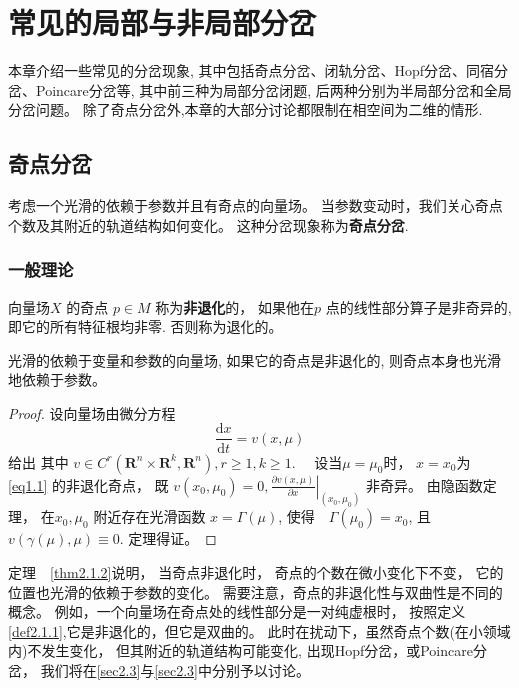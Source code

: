 \chapter{常见的局部与非局部分岔}
本章介绍一些常见的分岔现象,
其中包括奇点分岔、闭轨分岔、Hopf分岔、同宿分岔、Poincare分岔等,
其中前三种为局部分岔闭题,
后两种分别为半局部分岔和全局分岔问题。
除了奇点分岔外,本章的大部分讨论都限制在相空间为二维的情形.
\section{奇点分岔}
考虑一个光滑的依赖于参数并且有奇点的向量场。
当参数变动时，我们关心奇点个数及其附近的轨道结构如何变化。
这种分岔现象称为\textbf{奇点分岔}.
\subsection{一般理论}
\begin{defination}\label{def2.1.1}
  向量场\(X\) 的奇点 \( p \in M \) 称为\textbf{非退化}的，
  如果他在\(p\) 点的线性部分算子是非奇异的,
  即它的所有特征根均非零.
  否则称为退化的。
  \label{def2.1.1}
\end{defination}

\begin{theorem}\label{thm2.1.2}
  光滑的依赖于变量和参数的向量场,
  如果它的奇点是非退化的,
  则奇点本身也光滑地依赖于参数。
  \label{thm2.1.2}
\end{theorem}

\begin{proof}
  设向量场由微分方程
  \begin{equation}
    \frac{\mathrm{d} x}{\mathrm{d} t}=v(x, \mu)
    \label{eq1.1}
  \end{equation}
  给出
  其中
  \(v \in C^{r}\left(\mathbf{R}^{n} \times \mathbf{R}^{k}, \mathbf{R}^{n}\right), r \geqslant 1, k \geqslant 1  \).
  　设当\(\mu = \mu_{0}\)时，
  \(x=x_{0}\)为　\ref{eq1.1}
  的非退化奇点，
  既
  \(
  v\left(x_{0}, \mu_{0}\right)=0,\left.\frac{\partial v(x, \mu)}{\partial x}\right|_{\left(x_{0}, \mu_{0}\right)}
  \)
  非奇异。
  由隐函数定理，
  在\(x_{0},\mu_{0}\) 附近存在光滑函数
  \(x= \Gamma (\mu)\),
  使得　\(\Gamma ( \mu_{0}) = x_{0}\),
  且
  \(
v(\gamma(\mu), \mu) \equiv 0
  \).
  定理得证。
\end{proof}

\begin{remark}
  \label{rmk2.1.3}
  定理　\ref{thm2.1.2}说明，
  当奇点非退化时，
  奇点的个数在微小变化下不变，
  它的位置也光滑的依赖于参数的变化。
  需要注意，奇点的非退化性与双曲性是不同的概念。
  例如，一个向量场在奇点处的线性部分是一对纯虚根时，
  按照定义\ref{def2.1.1},它是非退化的，但它是双曲的。
  此时在扰动下，虽然奇点个数(在小领域内)不发生变化，
  但其附近的轨道结构可能变化,
  出现Hopf分岔，或Poincare分岔，
  我们将在\ref{sec2.3}与\ref{sec2.3}中分别予以讨论。
\end{remark}

